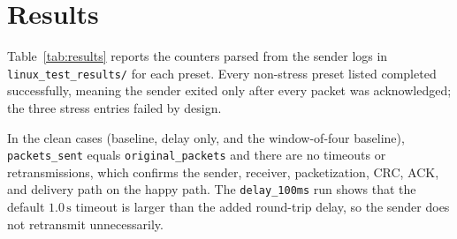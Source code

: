 \documentclass[conference]{IEEEtran}
\begin{document}
\section{Results}
Table~\ref{tab:results} reports the counters parsed from the sender logs in
\texttt{linux\_test\_results/} for each preset. Every non-stress preset listed
completed successfully, meaning the sender exited only after every packet was
acknowledged; the three stress entries failed by design.

\begin{table}[t]
\caption{Sender stats per preset (from \texttt{linux\_test\_results/}).}
\label{tab:results}
\centering
\scriptsize
\setlength{\tabcolsep}{3pt}
\end{table}

In the clean cases (baseline, delay only, and the window-of-four baseline),
\texttt{packets\_sent} equals \texttt{original\_packets} and there are no
timeouts or retransmissions, which confirms the sender, receiver,
packetization, CRC, ACK, and delivery path on the happy path. The
\texttt{delay\_100ms} run shows that the default $1.0\,\text{s}$ timeout is
larger than the added round-trip delay, so the sender does not retransmit
unnecessarily.
\end{document}
